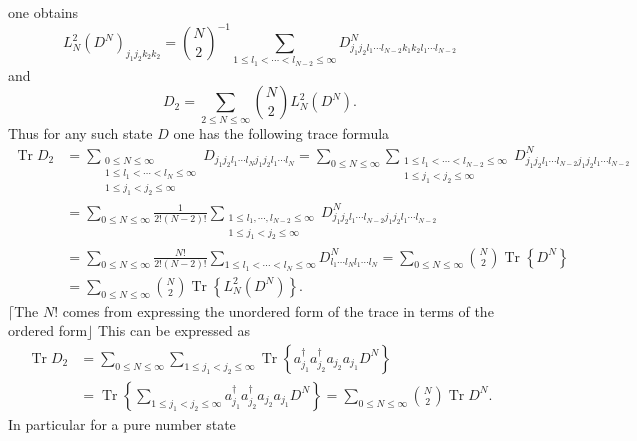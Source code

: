 \documentclass[aps,preprint]{revtex4}%
\begin{document}
one obtains%
\begin{equation}
L_{N}^{2}\left(  D^{N}\right)  _{j_{1}j_{2}k_{2}k_{2}}=\binom{N}{2}^{-1}%
\sum_{1\leq l_{1}<\cdots<l_{N-2}\leq\infty}D_{j_{1}j_{2}l_{1}\cdots
l_{N-2}k_{1}k_{2}l_{1}\cdots l_{N-2}}^{N}%
\end{equation}
and%
\begin{equation}
D_{2}=\sum_{2\leq N\leq\infty}\binom{N}{2}L_{N}^{2}\left(  D^{N}\right)  .
\end{equation}
Thus for any such state $D$ one has the following trace formula%
\begin{align}
\operatorname{Tr}D_{2} &  =\sum_{\substack{0\leq N\leq\infty\\1\leq
l_{1}<\cdots<l_{N}\leq\infty\\1\leq j_{1}<j_{2}\leq\infty}}D_{j_{1}j_{2}%
l_{1}\cdots l_{N}j_{1}j_{2}l_{1}\cdots l_{N}}=\sum_{0\leq N\leq\infty}%
\sum_{\substack{1\leq l_{1}<\cdots<l_{N-2}\leq\infty\\1\leq j_{1}<j_{2}%
\leq\infty}}D_{j_{1}j_{2}l_{1}\cdots l_{N-2}j_{1}j_{2}l_{1}\cdots l_{N-2}}%
^{N}\nonumber\\
&  =\sum_{0\leq N\leq\infty}\frac{1}{2!\left(  N-2\right)  !}\sum
_{\substack{1\leq l_{1},\cdots,l_{N-2}\leq\infty\\1\leq j_{1}<j_{2}\leq\infty
}}D_{j_{1}j_{2}l_{1}\cdots l_{N-2}j_{1}j_{2}l_{1}\cdots l_{N-2}}%
^{N}\nonumber\\
&  =\sum_{0\leq N\leq\infty}\frac{N!}{2!\left(  N-2\right)  !}\sum_{1\leq
l_{1}<\cdots<l_{N}\leq\infty}D_{l_{1}\cdots l_{N}l_{1}\cdots l_{N}}^{N}%
=\sum_{0\leq N\leq\infty}\binom{N}{2}\operatorname{Tr}\left\{  D^{N}\right\}
\nonumber\\
&  =\sum_{0\leq N\leq\infty}\binom{N}{2}\operatorname{Tr}\left\{  L_{N}%
^{2}\left(  D^{N}\right)  \right\}  .
\end{align}
$\lceil$The $N!$ comes from expressing the unordered form of the trace in
terms of the ordered form$\rfloor$ This can be expressed as
\begin{align}
\operatorname{Tr}D_{2} &  =\sum_{0\leq N\leq\infty}\sum_{1\leq j_{1}<j_{2}%
\leq\infty}\operatorname{Tr}\left\{  a_{j_{1}}^{\dagger}a_{j_{2}}^{\dagger
}a_{j_{2}}a_{j_{1}}D^{N}\right\}  \nonumber\\
&  =\operatorname{Tr}\left\{  \sum_{1\leq j_{1}<j_{2}\leq\infty}a_{j_{1}%
}^{\dagger}a_{j_{2}}^{\dagger}a_{j_{2}}a_{j_{1}}D^{N}\right\}  =\sum_{0\leq
N\leq\infty}\binom{N}{2}\operatorname{Tr}D^{N}.
\end{align}
In particular for a pure number state
\end{document}
